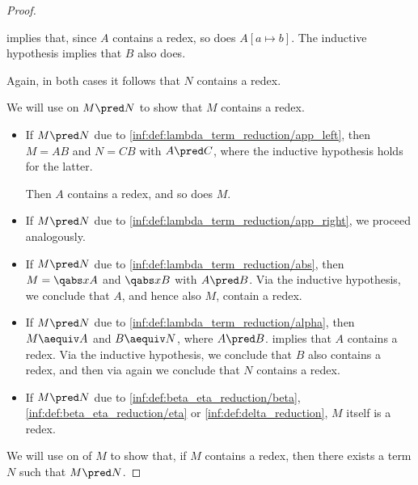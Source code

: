 \begin{proof}
\begin{itemize}
\begin{itemize}
       implies that, since \( A \) contains a redex, so does \( A[a \mapsto b] \). The inductive hypothesis implies that \( B \) also does.
    \end{itemize}

    Again, in both cases it follows that \( N \) contains a redex.
  \end{itemize}


  \SufficiencySubProof* We will use  on \( M \pred N \) to show that \( M \) contains a redex.

  \begin{itemize}
    \item If \( M \pred N \) due to \ref{inf:def:lambda_term_reduction/app_left}, then \( M = AB \) and \( N = CB \) with \( A \pred C \), where the inductive hypothesis holds for the latter.

    Then \( A \) contains a redex, and so does \( M \).

    \item If \( M \pred N \) due to \ref{inf:def:lambda_term_reduction/app_right}, we proceed analogously.

    \item If \( M \pred N \) due to \ref{inf:def:lambda_term_reduction/abs}, then \( M = \qabs x A \) and \( \qabs x B  \) with \( A \pred B \). Via the inductive hypothesis, we conclude that \( A \), and hence also \( M \), contain a redex.

    \item If \( M \pred N \) due to \ref{inf:def:lambda_term_reduction/alpha}, then \( M \aequiv A \) and \( B \aequiv N \), where \( A \pred B \).  implies that \( A \) contains a redex. Via the inductive hypothesis, we conclude that \( B \) also contains a redex, and then via  again we conclude that \( N \) contains a redex.

    \item If \( M \pred N \) due to \ref{inf:def:beta_eta_reduction/beta}, \ref{inf:def:beta_eta_reduction/eta} or \ref{inf:def:delta_reduction}, \( M \) itself is a redex.
  \end{itemize}

  \NecessitySubProof* We will use  on of \( M \) to show that, if \( M \) contains a redex, then there exists a term \( N \) such that \( M \pred N \).


\end{proof}
